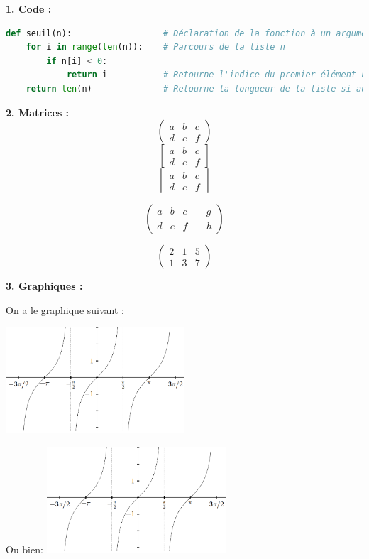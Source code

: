 \documentclass{article}
\begin{document}
\textbf{1. Code :}
\begin{lstlisting}[language=Python]
def seuil(n):                  # Déclaration de la fonction à un argument
    for i in range(len(n)):    # Parcours de la liste n
        if n[i] < 0:           
            return i           # Retourne l'indice du premier élément négatif
    return len(n)              # Retourne la longueur de la liste si aucun élément n'est négatif
\end{lstlisting}

\textbf{2. Matrices :}
\[
    \begin{pmatrix}
        a & b & c \\
        d & e & f
    \end{pmatrix}
\]
\[
    \begin{bmatrix}
        a & b & c \\
        d & e & f
    \end{bmatrix}
\]
\[
    \begin{vmatrix}
        a & b & c \\
        d & e & f
    \end{vmatrix}
\]


\[
    \begin{pmatrix}
        a & b & c & | & g \\
        d & e & f & | & h
    \end{pmatrix}
\]

\[
    \left(
    \begin{array}{cc|c}
            2 & 1 & 5 \\
            1 & 3 & 7
        \end{array}
    \right)
\]

\textbf{3. Graphiques :}

On a le graphique suivant :
\begin{center}
    \includegraphics[width=0.5\textwidth]{../images/tan.png}
\end{center}

Ou bien: \newline
\captionsetup{justification=raggedright, singlelinecheck=false}
\includegraphics[width=0.5\textwidth]{../images/tan.png}
\end{document}
